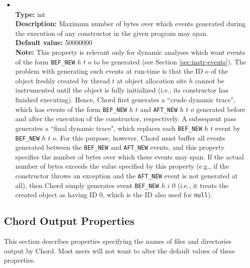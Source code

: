 \begin{itemize}
\item
{} \\
{\bf Type:} int \\
{\bf Description:} Maximum number of bytes over which events generated during the execution of any constructor in the given program may span. \\
{\bf Default value:} 50000000 \\
{\bf Note:} This property is relevant only for dynamic analyses which want events of the form {\tt BEF\_NEW} $h$ $t$ $o$ to be generated (see Section \ref{sec:instr-events}).  The problem with generating such events at run-time is that the ID $o$ of the object freshly created by thread $t$ at object allocation site $h$ cannot be instrumented until the object is fully initialized (i.e., its constructor has finished executing).  Hence, Chord first generates a ``crude dynamic trace", which has events of the form {\tt BEF\_NEW} $h$ $t$ and {\tt AFT\_NEW} $h$ $t$ $o$ generated before and after the execution of the constructor, respectively.  A subsequent pass generates a ``final dynamic trace", which replaces each {\tt BEF\_NEW} $h$ $t$ event by {\tt BEF\_NEW} $h$ $t$ $o$.  For this purpose, however, Chord must buffer all events generated between the {\tt BEF\_NEW} and {\tt AFT\_NEW} events, and this property specifies the number of bytes over which these events may span.  If the actual number of bytes exceeds the value specified by this property (e.g., if the constructor throws an exception and the {\tt AFT\_NEW} event is not generated at all), then Chord simply generates event {\tt BEF\_NEW} $h$ $i$ $0$ (i.e., it treats the created object as having ID 0, which is the ID also used for {\tt null}).
\end{itemize}

\subsection{Chord Output Properties}

This section describes properties specifying the names of files and directories output by Chord.
Most users will not want to alter the default values of these properties.

